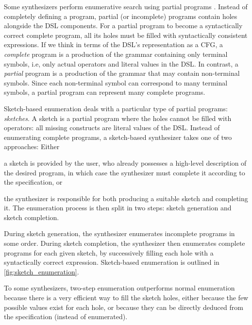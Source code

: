Some synthesizers perform enumerative search using partial programs \cite{Solar-LezamaPhDThesis,DBLP:conf/pldi/Solar-LezamaRBE05,DBLP:conf/asplos/Solar-LezamaTBSS06,DBLP:conf/pldi/WangCB17,DanielThesis,Regel20,DBLP:conf/pldi/FengMGDC17,DBLP:conf/popl/FengM0DR17,DBLP:journals/pacmpl/Yaghmazadeh0DD17,DBLP:journals/sttt/Solar-Lezama13}.
Instead of completely defining a program, partial (or incomplete) programs contain holes alongside the \ac{DSL} components. %
For a partial program to become a syntactically correct complete program, all its holes must be filled with syntactically consistent expressions.
%
If we think in terms of the \ac{DSL}'s representation as a \ac{CFG}, a \textit{complete} program is a production of the grammar containing only terminal symbols, i.e, only actual operators and literal values in the \ac{DSL}. In contrast, a \textit{partial} program is a production of the grammar that may contain non-terminal symbols. Since each non-terminal symbol can correspond to many terminal symbols, a partial program can represent many complete programs.

Sketch-based enumeration deals with a particular type of partial programs: \textit{sketches}. A sketch is a partial program where the holes cannot be filled with operators: all missing constructs are literal values of the \ac{DSL}.
%
Instead of enumerating complete programs, a sketch-based synthesizer takes one of two approaches: Either
\begin{enumerate*}[label=(\roman*)]
    \item a sketch is provided by the user, who already possesses a high-level description of the desired program, in which case the synthesizer must complete it according to the specification, or
    \item the synthesizer is responsible for both producing a suitable sketch and completing it. The enumeration process is then split in two steps: sketch generation and sketch completion.
\end{enumerate*}
During sketch generation, the synthesizer enumerates incomplete programs in some order. During sketch completion, the synthesizer then enumerates complete programs for each given sketch, by successively filling each hole with a syntactically correct expression. Sketch-based enumeration is outlined in \autoref{fig:sketch_enumeration}.

To some synthesizers, two-step enumeration outperforms normal enumeration because there is a very efficient way to fill the sketch holes, either because the few possible values exist for each hole, or because they can be directly deduced from the specification (instead of enumerated).



